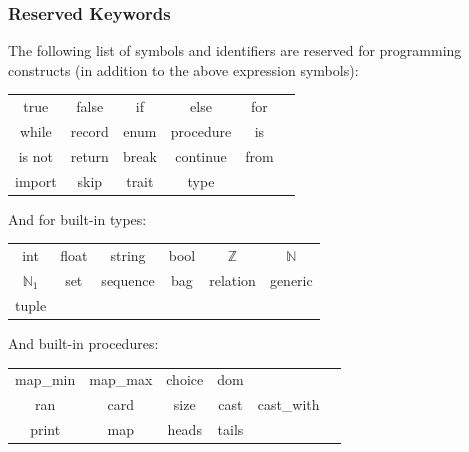\subsubsection{Reserved Keywords}
The following list of symbols and identifiers are reserved for programming constructs (in addition to the above expression symbols):

\begin{center}
\begin{tabular}{c c c c c c}
true & false & if & else & for\\
while & record & enum & procedure & is\\
is not & return & break & continue & from\\
import & skip & trait & type
\end{tabular}
\end{center}

And for built-in types:
\begin{center}
\begin{tabular}{c c c c c c}
int &
float &
string &
bool &
$\mathbb{Z}$ &
$\mathbb{N}$ \\
$\mathbb{N}_1$ &
set &
sequence &
bag &
relation &
generic \\
tuple &
\end{tabular}
\end{center}

And built-in procedures:

\begin{center}
\begin{tabular}{c c c c c c}
map\_min &
map\_max &
choice &
dom \\
ran &
card &
size &
cast &
cast\_with \\
print &
map &
heads &
tails
\end{tabular}
\end{center}
